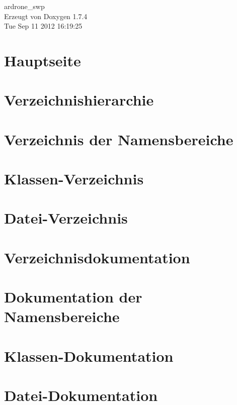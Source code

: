 \documentclass[a4paper]{book}
\begin{document}
\hypersetup{pageanchor=false}
\begin{titlepage}
\vspace*{7cm}
\begin{center}
{\Large ardrone\_\-swp }\\
\vspace*{1cm}
{\large Erzeugt von Doxygen 1.7.4}\\
\vspace*{0.5cm}
{\small Tue Sep 11 2012 16:19:25}\\
\end{center}
\end{titlepage}
\clearemptydoublepage
{}
\tableofcontents
\clearemptydoublepage
{}
\hypersetup{pageanchor=true}
\chapter{Hauptseite}
\label{index}\hypertarget{index}{}
\chapter{Verzeichnishierarchie}

\chapter{Verzeichnis der Namensbereiche}

\chapter{Klassen-\/Verzeichnis}

\chapter{Datei-\/Verzeichnis}

\chapter{Verzeichnisdokumentation}



\chapter{Dokumentation der Namensbereiche}




\chapter{Klassen-\/Dokumentation}


\chapter{Datei-\/Dokumentation}















\printindex
\end{document}
